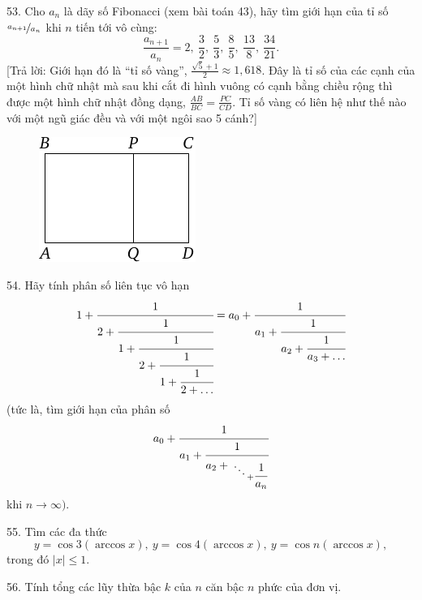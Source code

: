 \begin{problem}{53.}
	Cho $a_n$ là dãy số Fibonacci (xem bài toán 43), hãy tìm giới hạn của tỉ số $\nicefrac{a_{n+1}}{a_n}$ khi $n$ tiến tới vô cùng:
	\begin{equation*}
		\frac{a_{n+1}}{a_n}=2,\ \frac 32,\ \frac53, \ \frac85, \ \frac{13}8,
		\ \frac{34}{21}.
	\end{equation*}
	[Trả lời: Giới hạn đó là \enquote{tỉ số vàng}, $\frac{\sqrt{5}+1}{2}\approx 1,618$. Đây là tỉ số của các cạnh của một hình chữ nhật mà sau khi cắt đi hình vuông có cạnh bằng chiều rộng thì được một hình chữ nhật đồng dạng, $\frac{AB}{BC}=\frac{PC}{CD}$. Tỉ số vàng có liên hệ như thế nào với một ngũ giác đều và với một ngôi sao 5 cánh?]
	\begin{figure}
		\includegraphics{resources/taskbook-37}
	\end{figure}
\end{problem}

\begin{problem}{54.}
	Hãy tính phân số liên tục vô hạn
	\begin{equation*}
		1+\cfrac{1}{2+\cfrac{1}{1+\cfrac{1}{2+\cfrac{1}{1+\cfrac{1}{2+\ldots}}}}}=
		a_0+\cfrac{1}{a_1+\cfrac{1}{a_2+\cfrac{1}{a_3+\dots}}}
	\end{equation*}
	(tức là, tìm giới hạn của phân số 
	\begin{equation*}
		a_0+\cfrac{1}{a_1+\cfrac{1}{a_2+{\atop{\ddots \atop {}} + \cfrac{1}{a_n}}}}
	\end{equation*}
	khi $n\rightarrow \infty)$.
\end{problem}

\begin{problem}{55.}
	Tìm các đa thức 
	\begin{equation*}
		y=\cos 3 (\arccos x),\ y=\cos 4 (\arccos x),\ 
		y=\cos n (\arccos x),
	\end{equation*}
	trong đó $|x| \leqslant 1$.
\end{problem}

\begin{problem}{56.}
	Tính tổng các lũy thừa bậc $k$ của $n$ căn bậc $n$ phức của đơn vị. 
\end{problem}

